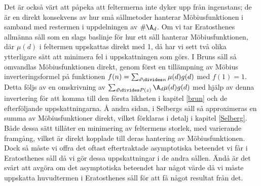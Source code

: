Det är också värt att påpeka att feltermerna inte dyker upp från ingenstans; de är en direkt konsekvens av hur små sållmetoder hanterar Möbiusfunktionen i samband med restermen i uppdelningen av \(\#\A_d\).
Om vi tar Eratosthenes allmänna såll som en slags baslinje för hur ett såll hanterar Möbiusfunktionen, där \(\mu(d)\) i feltermen uppskattas direkt med 1, då har vi sett två olika ytterligare sätt att minimera fel i uppskattningen som görs. 
I Bruns såll så omvandlas Möbiusfunktionen direkt, genom först en tillämpning av Möbius inverteringsformel på funktionen \(f(n) = \sum_{d\divides n}\mu(d)g(d)\) med \(f(1) = 1\). 
Detta följs av en omskrivning av \(\sum_{d\divides P(z)}\A_d \mu(d) g(d)\) med hjälp av denna invertering för att komma till den första likheten i kapitel \ref{brun} och de efterföljande uppskattningarna. 
Å andra sidan, i Selbergs såll så approximeras en summa av Möbiusfunktioner direkt, vilket förklaras i detalj i kapitel \ref{Selberg}.
Både dessa sätt tillåter en minimering av feltermens storlek, med varierande framgång, vilket är direkt kopplade till deras hantering av Möbiusfunktionen.
Dock så måste vi offra det oftast eftertraktade asymptotiska beteendet vi får i Eratosthenes såll då vi gör dessa uppskattningar i de andra sållen.
Ändå är det svårt att avgöra om det asymptotiska beteendet har något värde då vi måste uppskatta huvudtermen i Eratosthenes såll för att få något resultat från det.



